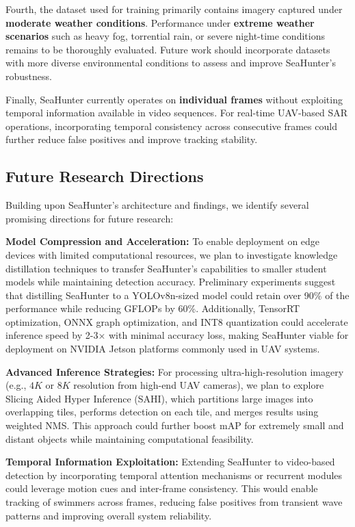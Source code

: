 \documentclass[lettersize,journal]{IEEEtran}
\begin{document}
Fourth, the dataset used for training primarily contains imagery captured under \textbf{moderate weather conditions}. Performance under \textbf{extreme weather scenarios} such as heavy fog, torrential rain, or severe night-time conditions remains to be thoroughly evaluated. Future work should incorporate datasets with more diverse environmental conditions to assess and improve SeaHunter's robustness.

Finally, SeaHunter currently operates on \textbf{individual frames} without exploiting temporal information available in video sequences. For real-time UAV-based SAR operations, incorporating temporal consistency across consecutive frames could further reduce false positives and improve tracking stability.

\subsection{Future Research Directions}

Building upon SeaHunter's architecture and findings, we identify several promising directions for future research:

\textbf{Model Compression and Acceleration:} To enable deployment on edge devices with limited computational resources, we plan to investigate knowledge distillation techniques to transfer SeaHunter's capabilities to smaller student models while maintaining detection accuracy. Preliminary experiments suggest that distilling SeaHunter to a YOLOv8n-sized model could retain over 90\% of the performance while reducing GFLOPs by 60\%. Additionally, TensorRT optimization, ONNX graph optimization, and INT8 quantization could accelerate inference speed by 2-3× with minimal accuracy loss, making SeaHunter viable for deployment on NVIDIA Jetson platforms commonly used in UAV systems.

\textbf{Advanced Inference Strategies:} For processing ultra-high-resolution imagery (e.g., $4K$ or $8K$ resolution from high-end UAV cameras), we plan to explore Slicing Aided Hyper Inference (SAHI), which partitions large images into overlapping tiles, performs detection on each tile, and merges results using weighted NMS. This approach could further boost mAP for extremely small and distant objects while maintaining computational feasibility.

\textbf{Temporal Information Exploitation:} Extending SeaHunter to video-based detection by incorporating temporal attention mechanisms or recurrent modules could leverage motion cues and inter-frame consistency. This would enable tracking of swimmers across frames, reducing false positives from transient wave patterns and improving overall system reliability.
\end{document}
